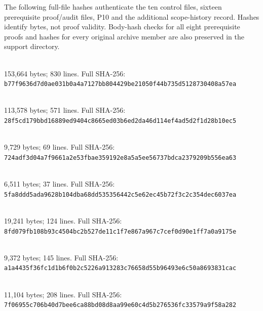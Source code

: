 \documentclass[11pt]{article}
\begin{document}
The following full-file hashes authenticate the ten control files, sixteen
prerequisite proof/audit files, P10 and the additional scope-history record.
Hashes identify bytes, not proof validity. Body-hash checks for all eight
prerequisite proofs and hashes for every original archive member are also
preserved in the support directory.
\begingroup\small
\par\noindent{}\\
153,664 bytes; 830 lines. Full SHA-256:\\
\nolinkurl{b77f9636d7d0ae031b0a4a7127bb804429be21050f44b735d5128730408a57ea}\par\smallskip
\par\noindent{}\\
113,578 bytes; 571 lines. Full SHA-256:\\
\nolinkurl{28f5cd179bbd16889ed9404c8665ed03b6ed2da46d114ef4ad5d2f1d28b10ec5}\par\smallskip
\par\noindent{}\\
9,729 bytes; 69 lines. Full SHA-256:\\
\nolinkurl{724adf3d04a7f9661a2e53fbae359192e8a5a5ee56737bdca2379209b556ea63}\par\smallskip
\par\noindent{}\\
6,511 bytes; 37 lines. Full SHA-256:\\
\nolinkurl{5fa8ddd5ada9628b104dba68dd535356442c5e62ec45b72f3c2c354dec6037ea}\par\smallskip
\par\noindent{}\\
19,241 bytes; 124 lines. Full SHA-256:\\
\nolinkurl{8fd079fb108b93c4504bc2b527de11c1f7e867a967c7cef0d90e1ff7a0a9175e}\par\smallskip
\par\noindent{}\\
9,372 bytes; 145 lines. Full SHA-256:\\
\nolinkurl{a1a4435f36fc1d1b6f0b2c5226a913283c76658d55b96493e6c50a8693831cac}\par\smallskip
\par\noindent{}\\
11,104 bytes; 208 lines. Full SHA-256:\\
\nolinkurl{7f06955c706b40d7bee6ca88bd08d8aa99e60c4d5b276536fc33579a9f58a282}\par\smallskip
\end{document}
